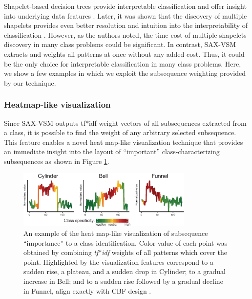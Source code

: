 \documentclass[conference]{IEEEtran}
\begin{document}
Shapelet-based decision trees provide interpretable classification and offer insight 
into underlying data features \cite{shapelet}. 
Later, it was shown that the discovery of multiple shapelets provides even 
better resolution and intuition into the interpretability of classification \cite{bagnal}. 
However, as the authors noted, the time cost of multiple shapelets discovery
in many class problems could be significant. 
In contrast, SAX-VSM extracts and weights all patterns at once without
any added cost. Thus, it could be the only choice for interpretable classification 
in many class problems. 
Here, we show a few examples in which we exploit the subsequence weighting 
provided by our technique.

\subsubsection{Heatmap-like visualization}
Since SAX-VSM outputs tf$\ast$idf weight vectors of all subsequences extracted from a
class, it is possible to find the weight of any arbitrary selected subsequence.
This feature enables a novel heat map-like visualization technique that provides an immediate
insight into the layout of ``important'' class-characterizing subsequences 
as shown in Figure \ref{fig:heat}.

\begin{figure}[t]
   \centering
   \vspace{0.09cm}
   \includegraphics[width=87mm]{figures/CBF-HEAT.eps}
   \caption{An example of the heat map-like visualization of subsequence ``importance''
   to a class identification. Color value of each point was obtained by combining 
   \textit{tf$\ast$idf} weights of all patterns which cover the point.
   Highlighted by the visualization features correspond to a sudden rise, a plateau, 
   and a sudden drop in Cylinder; to a gradual increase in Bell; and to a sudden rise 
   followed by a gradual decline in Funnel, align exactly with CBF design \cite{cbf}.}
   \label{fig:heat}
   \vspace{-0.15cm}
\end{figure}
\end{document}
